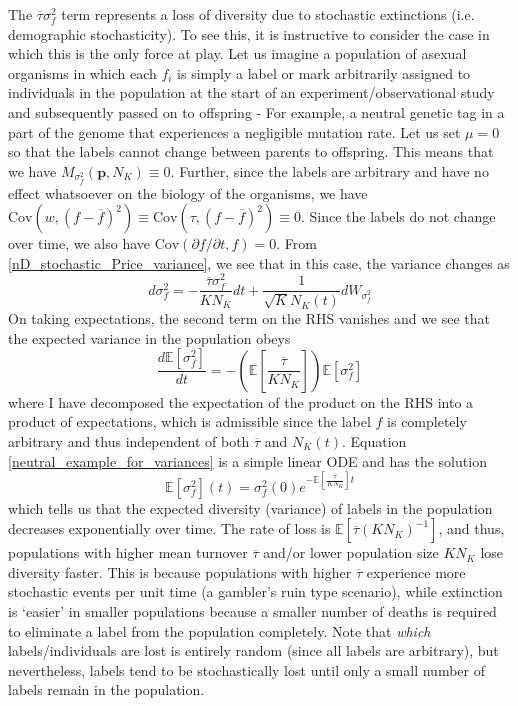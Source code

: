 The $\overline{\tau}\sigma^2_{f}$ term represents a loss of diversity due to stochastic extinctions (i.e. demographic stochasticity). To see this, it is instructive to consider the case in which this is the only force at play. Let us imagine a population of asexual organisms in which each $f_i$ is simply a label or mark arbitrarily assigned to individuals in the population at the start of an experiment/observational study and subsequently passed on to offspring - For example, a neutral genetic tag in a part of the genome that experiences a negligible mutation rate. Let us set $\mu = 0$ so that the labels cannot change between parents to offspring. This means that we have $M_{\sigma^2_f}(\mathbf{p},N_K) \equiv 0$. Further, since the labels are arbitrary and have no effect whatsoever on the biology of the organisms, we have $\textrm{Cov}\left(w,(f - \overline{f})^2\right) \equiv \textrm{Cov}\left(\tau,(f - \overline{f})^2\right) \equiv 0$. Since the labels do not change over time, we also have $\textrm{Cov}\left(\partial f/\partial t,f\right) = 0$. From \eqref{nD_stochastic_Price_variance}, we see that in this case, the variance changes as
\begin{equation}
d\sigma^2_f = - \frac{\overline{\tau}\sigma^2_{f}}{KN_K}dt + \frac{1}{\sqrt{K}N_{K}(t)}dW_{\sigma^2_{f}}
\end{equation}
On taking expectations, the second term on the RHS vanishes and we see that the expected variance in the population obeys
\begin{equation}
\label{neutral_example_for_variances}
\frac{d \mathbb{E}[\sigma^2_f]}{dt} = - \left(\mathbb{E}\left[\frac{\overline{\tau}}{KN_K}\right]\right)\mathbb{E}[\sigma^2_{f}]
\end{equation}
where I have decomposed the expectation of the product on the RHS into a product of expectations, which is admissible since the label $f$ is completely arbitrary and thus independent of both $\overline{\tau}$ and $N_K(t)$. Equation \eqref{neutral_example_for_variances} is a simple linear ODE and has the solution
\begin{equation}
\mathbb{E}[\sigma^2_f](t) = \sigma^2_f(0)e^{-\mathbb{E}\left[\frac{\overline{\tau}}{KN_K}\right]t}
\end{equation}
which tells us that the expected diversity (variance) of labels in the population decreases exponentially over time. The rate of loss is $\mathbb{E}\left[\overline{\tau}(KN_K)^{-1}\right]$, and thus, populations with higher mean turnover $\overline{\tau}$  and/or lower population size $KN_K$ lose diversity faster. This is because populations with higher $\overline{\tau}$ experience more stochastic events per unit time (a gambler's ruin type scenario), while extinction is `easier' in smaller populations because a smaller number of deaths is required to eliminate a label from the population completely. Note that \emph{which} labels/individuals are lost is entirely random (since all labels are arbitrary), but nevertheless, labels tend to be stochastically lost until only a small number of labels remain in the population.

